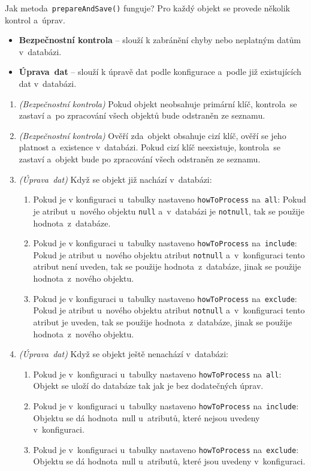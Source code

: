 Jak metoda~\texttt{prepareAndSave()} funguje?
Pro každý objekt se provede několik kontrol a~úprav.

\begin{itemize}
    \item \textbf{Bezpečnostní kontrola} -- slouží k zabránění chyby nebo neplatným datům v~databázi.
    \item \textbf{Úprava~dat} -- slouží k úpravě dat podle konfigurace a~podle již existujících dat v~databázi.
\end{itemize}

\begin{enumerate}
    \item \textit{(Bezpečnostní kontrola)} Pokud objekt neobsahuje primární klíč, kontrola~se zastaví a~po 
    zpracování všech objektů bude odstraněn ze seznamu.
    \item \textit{(Bezpečnostní kontrola)} Ověří zda~objekt obsahuje cizí klíč, ověří se jeho platnost a~existence v~databázi.
    Pokud cizí klíč neexistuje, kontrola~se zastaví a~objekt bude po zpracování všech odstraněn ze seznamu.
    \item \textit{(Úprava~dat)} Když se objekt již nachází v~databázi:
    \begin{enumerate}
        \item Pokud je v konfiguraci u~tabulky nastaveno \texttt{howToProcess} na~\texttt{all}:
        Pokud je atribut u~nového objektu \texttt{null} a~v~databázi je \texttt{notnull}, tak se použije hodnota~z~databáze.
        \item Pokud je v konfiguraci u~tabulky nastaveno \texttt{howToProcess} na~\texttt{include}:
        Pokud je atribut u~nového objektu atribut \texttt{notnull} a~v~konfiguraci tento atribut není uveden, tak se použije hodnota~z~databáze,
        jinak se použije hodnota~z~nového objektu.
        \item Pokud je v konfiguraci u~tabulky nastaveno \texttt{howToProcess} na~\texttt{exclude}:
        Pokud je atribut u~nového objektu atribut \texttt{notnull} a~v~konfiguraci tento atribut je uveden, tak se použije hodnota~z~databáze,
        jinak se použije hodnota~z~nového objektu.
    \end{enumerate}

    \item \textit{(Úprava~dat)} Když se objekt ještě nenachází v~databázi:
    \begin{enumerate}
        \item Pokud je v~konfiguraci u~tabulky nastaveno \texttt{howToProcess} na~\texttt{all}:
        Objekt se uloží do databáze tak jak je bez dodatečných úprav.
        \item Pokud je v~konfiguraci u~tabulky nastaveno \texttt{howToProcess} na~\texttt{include}:
        Objektu se dá hodnota~null u~atributů, které nejsou uvedeny v~konfiguraci.
        \item Pokud je v~konfiguraci u~tabulky nastaveno \texttt{howToProcess} na~\texttt{exclude}:
        Objektu se dá hodnota~null u~atributů, které jsou uvedeny v~konfiguraci.
    \end{enumerate}
\end{enumerate}

